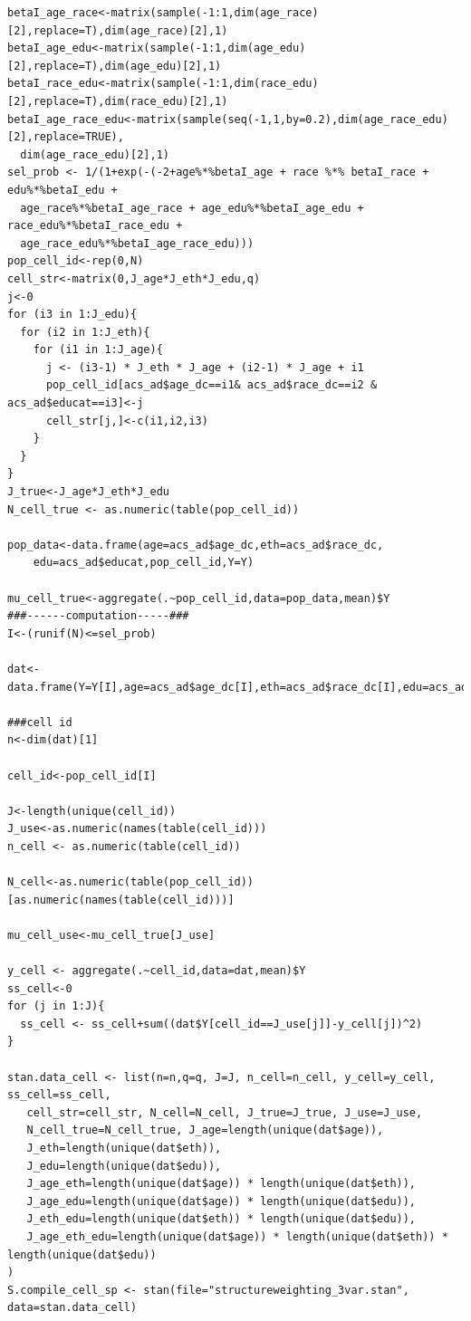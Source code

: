 \documentclass[11pt]{article}
\begin{document}
\begin{small}
\begin{verbatim}
betaI_age_race<-matrix(sample(-1:1,dim(age_race)[2],replace=T),dim(age_race)[2],1)
betaI_age_edu<-matrix(sample(-1:1,dim(age_edu)[2],replace=T),dim(age_edu)[2],1)
betaI_race_edu<-matrix(sample(-1:1,dim(race_edu)[2],replace=T),dim(race_edu)[2],1)
betaI_age_race_edu<-matrix(sample(seq(-1,1,by=0.2),dim(age_race_edu)[2],replace=TRUE),
  dim(age_race_edu)[2],1)
sel_prob <- 1/(1+exp(-(-2+age%*%betaI_age + race %*% betaI_race + edu%*%betaI_edu + 
  age_race%*%betaI_age_race + age_edu%*%betaI_age_edu + race_edu%*%betaI_race_edu + 
  age_race_edu%*%betaI_age_race_edu)))
pop_cell_id<-rep(0,N)
cell_str<-matrix(0,J_age*J_eth*J_edu,q)
j<-0
for (i3 in 1:J_edu){
  for (i2 in 1:J_eth){
    for (i1 in 1:J_age){
      j <- (i3-1) * J_eth * J_age + (i2-1) * J_age + i1
      pop_cell_id[acs_ad$age_dc==i1& acs_ad$race_dc==i2 & acs_ad$educat==i3]<-j
      cell_str[j,]<-c(i1,i2,i3)
    }
  }
}
J_true<-J_age*J_eth*J_edu
N_cell_true <- as.numeric(table(pop_cell_id))

pop_data<-data.frame(age=acs_ad$age_dc,eth=acs_ad$race_dc,
	edu=acs_ad$educat,pop_cell_id,Y=Y)

mu_cell_true<-aggregate(.~pop_cell_id,data=pop_data,mean)$Y
###------computation-----###
I<-(runif(N)<=sel_prob)

dat<-data.frame(Y=Y[I],age=acs_ad$age_dc[I],eth=acs_ad$race_dc[I],edu=acs_ad$educat[I])

###cell id
n<-dim(dat)[1]

cell_id<-pop_cell_id[I]

J<-length(unique(cell_id))
J_use<-as.numeric(names(table(cell_id)))
n_cell <- as.numeric(table(cell_id))   

N_cell<-as.numeric(table(pop_cell_id))[as.numeric(names(table(cell_id)))]

mu_cell_use<-mu_cell_true[J_use]

y_cell <- aggregate(.~cell_id,data=dat,mean)$Y
ss_cell<-0
for (j in 1:J){
  ss_cell <- ss_cell+sum((dat$Y[cell_id==J_use[j]]-y_cell[j])^2)
}

stan.data_cell <- list(n=n,q=q, J=J, n_cell=n_cell, y_cell=y_cell, ss_cell=ss_cell,
   cell_str=cell_str, N_cell=N_cell, J_true=J_true, J_use=J_use,
   N_cell_true=N_cell_true, J_age=length(unique(dat$age)),
   J_eth=length(unique(dat$eth)),
   J_edu=length(unique(dat$edu)),
   J_age_eth=length(unique(dat$age)) * length(unique(dat$eth)),
   J_age_edu=length(unique(dat$age)) * length(unique(dat$edu)),
   J_eth_edu=length(unique(dat$eth)) * length(unique(dat$edu)),
   J_age_eth_edu=length(unique(dat$age)) * length(unique(dat$eth)) * length(unique(dat$edu))
)
S.compile_cell_sp <- stan(file="structureweighting_3var.stan", data=stan.data_cell)
\end{verbatim}\end{small}
\end{document}
